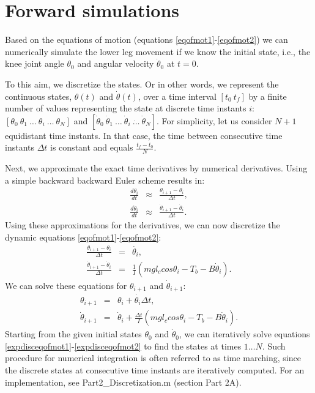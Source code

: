 \documentclass[
a4paper, %
11pt, %
onecolumn, %
openright, %
]{memoir}
\begin{document}
\chapter{Forward simulations}

Based on the equations of motion (equations \ref{eqofmot1}-\ref{eqofmot2}) we can numerically simulate the lower leg movement if we know the initial state, i.e., the knee joint angle $\theta_0$ and angular velocity $\dot{\theta}_0$ at $t = 0$. 

To this aim, we discretize the states. Or in other words, we represent the continuous states, $\theta(t)$ and $\dot\theta(t)$, over a time interval $[t_0 \: t_f]$ by a finite number of values representing the state at discrete time instants $i$: $[\theta_0 \: \theta_1 \: \ldots \: \theta_i \: \ldots \: \theta_N]$ and $[\dot\theta_0 \: \dot\theta_1 \: \ldots \: \dot\theta_i \: \dot\ldots \: \dot\theta_N]$. For simplicity, let us consider $N + 1$ equidistant time instants. In that case, the time between consecutive time instants $\Delta t$ is constant and equals $\frac{t_f - t_0}{N}$. 

Next, we approximate the exact time derivatives by numerical derivatives. Using a simple backward backward Euler scheme results in:
\begin{eqnarray}
\frac{d\theta_i}{dt} & \approx & \frac{\theta_{i+1} - \theta_{i}}{\Delta t}, \\
\frac{d\dot\theta_i}{dt} & \approx & \frac{\dot\theta_{i+1} - \dot\theta_{i}}{\Delta t}.
\label{BE}
\end{eqnarray}
Using these approximations for the derivatives, we can now discretize the dynamic equations \ref{eqofmot1}-\ref{eqofmot2}:
\begin{eqnarray}
\frac{\theta_{i+1} - \theta_{i}}{\Delta t} & = & \dot{\theta_i}, \\
\frac{\dot\theta_{i+1} - \dot\theta_{i}}{\Delta t} & = &\frac{1}{I} \left( m g l_c cos\theta_i - T_b - B \dot{\theta}_i \right).
\label{discseteqofmot}
\end{eqnarray}
We can solve these equations for $\theta_{i+1}$ and $\dot\theta_{i+1}$:
\begin{eqnarray}
\theta_{i+1} & = & \theta_{i} + \dot{\theta_i} \Delta t , \label{expdisceqofmot1}\\
\dot\theta_{i+1} & = & \dot\theta_{i} + \frac{\Delta t}{I} \left( m g l_c cos\theta_i - T_b - B \dot{\theta}_i \right).
\label{expdisceqofmot2}
\end{eqnarray}
Starting from the given initial states $\theta_0$ and $\dot{\theta}_0$, we can iteratively solve equations \ref{expdisceqofmot1}-\ref{expdisceqofmot2} to find the states at times $1 \ldots N$. Such procedure for numerical integration is often referred to as time marching, since the discrete states at consecutive time instants are iteratively computed. For an implementation, see Part2\_Discretization.m (section Part 2A).
\end{document}
